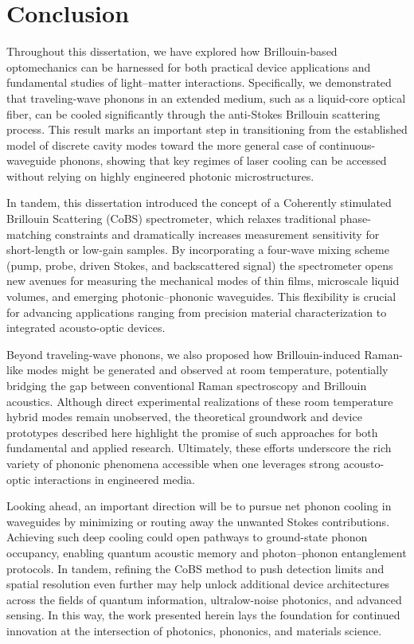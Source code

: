 \chapter{Conclusion}
\label{ch:Conclusion}
\acresetall

Throughout this dissertation, we have explored how Brillouin-based optomechanics can be harnessed for both practical device applications and fundamental studies of light–matter interactions. Specifically, we demonstrated that traveling-wave phonons in an extended medium, such as a liquid-core optical fiber, can be cooled significantly through the anti-Stokes Brillouin scattering process. This result marks an important step in transitioning from the established model of discrete cavity modes toward the more general case of continuous-waveguide phonons, showing that key regimes of laser cooling can be accessed without relying on highly engineered photonic microstructures.

In tandem, this dissertation introduced the concept of a Coherently stimulated Brillouin Scattering (\acs{CoBS}) spectrometer, which relaxes traditional phase-matching constraints and dramatically increases measurement sensitivity for short-length or low-gain samples. By incorporating a four-wave mixing scheme (pump, probe, driven Stokes, and backscattered signal) the spectrometer opens new avenues for measuring the mechanical modes of thin films, microscale liquid volumes, and emerging photonic–phononic waveguides. This flexibility is crucial for advancing applications ranging from precision material characterization to integrated acousto-optic devices.

Beyond traveling-wave phonons, we also proposed how Brillouin-induced Raman-like modes might be generated and observed at room temperature, potentially bridging the gap between conventional Raman spectroscopy and Brillouin acoustics. Although direct experimental realizations of these room temperature hybrid modes remain unobserved, the theoretical groundwork and device prototypes described here highlight the promise of such approaches for both fundamental and applied research. Ultimately, these efforts underscore the rich variety of phononic phenomena accessible when one leverages strong acousto-optic interactions in engineered media.

Looking ahead, an important direction will be to pursue net phonon cooling in waveguides by minimizing or routing away the unwanted Stokes contributions. Achieving such deep cooling could open pathways to ground-state phonon occupancy, enabling quantum acoustic memory and photon–phonon entanglement protocols. In tandem, refining the CoBS method to push detection limits and spatial resolution even further may help unlock additional device architectures across the fields of quantum information, ultralow-noise photonics, and advanced sensing. In this way, the work presented herein lays the foundation for continued innovation at the intersection of photonics, phononics, and materials science.

\clearpage
\thispagestyle{empty}
\null
\newpage

